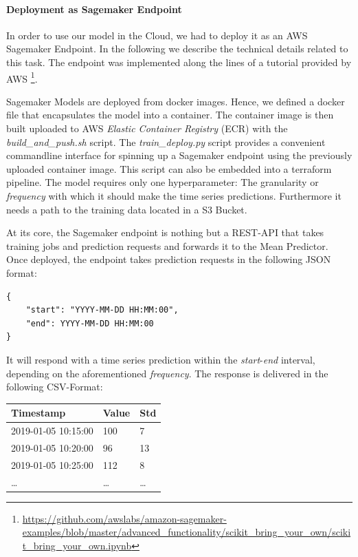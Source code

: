 \paragraph{Deployment as Sagemaker Endpoint}
In order to use our model in the Cloud, we had to deploy it as an AWS Sagemaker Endpoint. In the following we describe the technical details related to this task. The endpoint was implemented along the lines of a tutorial provided by AWS \footnote{\url{https://github.com/awslabs/amazon-sagemaker-examples/blob/master/advanced_functionality/scikit_bring_your_own/scikit_bring_your_own.ipynb}}.

Sagemaker Models are deployed from docker images. Hence, we defined a docker file that encapsulates the model into a container. The container image is then built uploaded to AWS \textit{Elastic Container Registry} (ECR) with the \textit{build\_and\_push.sh} script. The \textit{train\_deploy.py} script provides a convenient commandline interface for spinning up a Sagemaker endpoint using the previously uploaded container image. This script can also be embedded into a terraform pipeline.
The model requires only one hyperparameter: The granularity or \textit{frequency} with which it should make the time series predictions. Furthermore it needs a path to the training data located in a S3 Bucket.

At its core, the Sagemaker endpoint is nothing but a REST-API that takes training jobs and prediction requests and forwards it to the Mean Predictor. Once deployed, the endpoint takes prediction requests in the following JSON format:

\begin{lstlisting}
{
    "start": "YYYY-MM-DD HH:MM:00",
    "end": YYYY-MM-DD HH:MM:00
}
\end{lstlisting}

It will respond with a time series prediction within the \textit{start}-\textit{end} interval, depending on the aforementioned \textit{frequency}. The response is delivered in the following CSV-Format:

\begin{center}
    \begin{tabular}{ | l | l | l |}
    \hline
    Timestamp & Value & Std \\ \hline
    2019-01-05 10:15:00 & 100 & 7 \\ \hline
    2019-01-05 10:20:00 & 96 & 13 \\ \hline
    2019-01-05 10:25:00 & 112 & 8 \\ \hline
    \dots & \dots & \dots \\
    \hline
    \end{tabular}
\end{center}

